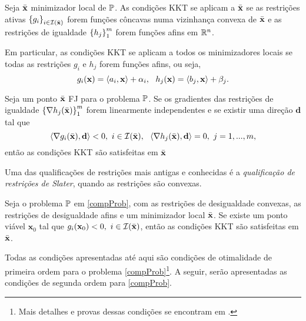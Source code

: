 \begin{corollary}\label{cor:restLinConc}
Seja $\bar{\mathbf{x}}$ minimizador local de $\mathbb{P}$. As condi\c{c}\~{o}es KKT se aplicam a $\bar{\mathbf{x}}$ se as restri\c{c}\~{o}es ativas $\left\lbrace g_i\right\rbrace_{i \in \mathcal{I}(\bar{\mathbf{x}})}$ forem fun\c{c}\~{o}es c\^{o}ncavas numa vizinhan\c{c}a convexa de $\bar{\mathbf{x}}$ e as restri\c{c}\~{o}es de igualdade $\left\lbrace h_j\right\rbrace_{1}^{m}$ forem fun\c{c}\~{o}es afins em $\mathbb{R}^{n}$.

Em particular, as condi\c{c}\~{o}es KKT se aplicam a todos os minimizadores locais se todas as restri\c{c}\~{o}es $g_i$ e $h_j$ forem fun\c{c}\~{o}es afins, ou seja,
\begin{equation*}
g_i(\mathbf{x}) = \left\langle a_i,\mathbf{x}\right\rangle + \alpha_i ,~~ h_j(\mathbf{x}) = \left\langle b_j,\mathbf{x}\right\rangle + \beta_j.
\end{equation*}
\end{corollary}

\begin{theorem}
Seja um ponto $\bar{\mathbf{x}}$ FJ para o problema $\mathbb{P}$. Se os gradientes das restri\c{c}\~{o}es de igualdade $\left\lbrace\nabla h_j(\bar{\mathbf{x}})\right\rbrace_{1}^{m}$ forem linearmente independentes e se existir uma dire\c{c}\~{a}o $\mathbf{d}$ tal que 
\begin{equation}
\left\langle\nabla g_i(\bar{\mathbf{x}}),\mathbf{d}\right\rangle < 0,~i \in \mathcal{I}(\bar{\mathbf{x}}),~~\left\langle\nabla h_j(\bar{\mathbf{x}}),\mathbf{d}\right\rangle = 0,~j = 1,...,m,
\end{equation}
ent\~{a}o as condi\c{c}\~{o}es KKT s\~{a}o satisfeitas em $\bar{\mathbf{x}}$
\end{theorem}

Uma das qualifica\c{c}\~{o}es de restri\c{c}\~{o}es mais antigas e conhecidas \'{e} a \textit{qualifica\c{c}\~{a}o de restri\c{c}\~{o}es de Slater}, quando as restri\c{c}\~{o}es s\~{a}o convexas.

\begin{corollary}[Slater]
Seja o problema $\mathbb{P}$ em \eqref{compProb}, com as restri\c{c}\~{o}es de desigualdade convexas, as restri\c{c}\~{o}es de desigualdade afins e um minimizador local $\bar{\mathbf{x}}$. Se existe um ponto vi\'{a}vel $\mathbf{x}_0$ tal que $g_i(\mathbf{x}_0) <0,~i \in \mathcal{I}(\bar{\mathbf{x}})$, ent\~{a}o as condi\c{c}\~{o}es KKT s\~{a}o satisfeitas em $\bar{\mathbf{x}}$.
\end{corollary}

Todas as condi\c{c}\~{o}es apresentadas at\'{e} aqui s\~{a}o condi\c{c}\~{o}es de otimalidade de primeira ordem para o problema \eqref{compProb}\footnote{Mais detalhes e provas dessas condi\c{c}\~{o}es se encontram em \cite[pp. 211-220]{guller}.}. A seguir, ser\~{a}o apresentadas as condi\c{c}\~{o}es de segunda ordem para \eqref{compProb}. 

